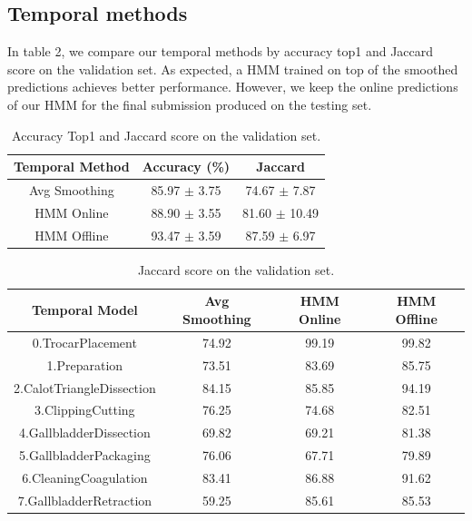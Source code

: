 \documentclass[10pt,twocolumn,letterpaper]{article}
\begin{document}
\subsection{Temporal methods}

In table 2, we compare our temporal methods by accuracy top1 and Jaccard score on the validation set. As expected, a HMM trained on top of the smoothed predictions achieves better performance. However, we keep the online predictions of our HMM for the final submission produced on the testing set.

\begin{table}
	\begin{center}
		\begin{tabular}{|c|c|c|}
			\hline
			Temporal Method & Accuracy (\%) & Jaccard \\
			\hline\hline
			Avg Smoothing & 85.97 $\pm$ 3.75 & 74.67 $\pm$ 7.87\\
			HMM Online & 88.90 $\pm$ 3.55 & 81.60 $\pm$ 10.49\\
			HMM Offline & 93.47 $\pm$ 3.59 & 87.59 $\pm$ 6.97\\
			\hline
		\end{tabular}
	\end{center}
	\caption{Accuracy Top1 and Jaccard score on the validation set.}
\end{table}


\begin{table}
	\begin{center}
		\begin{tabular}{|c|c|c|c|}
			\hline
			Temporal Model & Avg Smoothing & HMM Online & HMM Offline \\
			\hline
			0.TrocarPlacement & 74.92 & 99.19 & 99.82 \\
			1.Preparation & 73.51 & 83.69 & 85.75 \\
			2.CalotTriangleDissection & 84.15 & 85.85 &  94.19 \\
			3.ClippingCutting & 76.25 & 74.68 & 82.51 \\
			4.GallbladderDissection & 69.82 & 69.21 & 81.38 \\
			5.GallbladderPackaging & 76.06 & 67.71 & 79.89 \\
			6.CleaningCoagulation & 83.41 & 86.88 & 91.62 \\
			7.GallbladderRetraction & 59.25 & 85.61 & 85.53 \\
			\hline
		\end{tabular}
	\end{center}
	\caption{Jaccard score on the validation set.}
\end{table}
\end{document}
